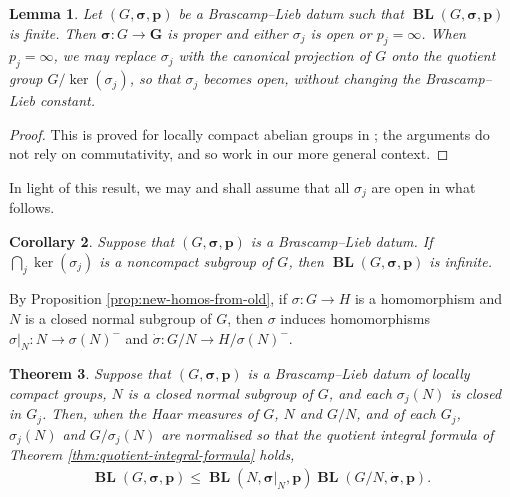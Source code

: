 \documentclass[12pt,twoside,a4paper]{amsart}
\newtheorem{thm}{Theorem}[section]
\newtheorem{lem}[thm]{Lemma}%
\newtheorem{cor}[thm]{Corollary}%
\theoremstyle{definition}
\theoremstyle{remark}
\numberwithin{equation}{section}
\newcommand{\afterbar}{^-}
\newcommand{\BL}{\operatorname{\mathbf{BL}}}
\newcommand{\bss}{\boldsymbol{\sigma}}
\newcommand{\bsds}{\boldsymbol{\dot\sigma}}
\newcommand{\bsp}{\boldsymbol{p}}
\newcommand{\bsG}{\boldsymbol{G}}
\begin{document}
\begin{lem}\label{lem:bss-must-be-proper}
Let $(G, \bss,\bsp)$ be a Brascamp--Lieb datum such that  $\BL(G, \bss,\bsp)$ is finite.
Then $\bss\colon  G \to \bsG $ is proper and either  $\sigma_j$ is open or $p_j = \infty$.
When $p_j = \infty$, we may replace $\sigma_j$ with the canonical projection of $G$ onto the quotient group $G / \ker(\sigma_j)$, so that $\sigma_j$ becomes open, without changing the Brascamp--Lieb constant.
\end{lem}

\begin{proof}
This is proved for locally compact abelian groups in \cite{BC25}; the arguments do not rely on commutativity, and so work in our more general context.
\end{proof}

In light of this result, we may and shall assume that all $\sigma_j$ are open in what follows.


\begin{cor}\label{cor:kernel-compact}
Suppose that $(G, \bss,\bsp)$ is a Brascamp--Lieb datum.
If $\bigcap_j \ker(\sigma_j)$ is a noncompact subgroup of $G$, then $\BL(G, \bss,\bsp)$ is infinite. 
\end{cor}


By Proposition \ref{prop:new-homos-from-old}, if  $\sigma\colon  G \to H$ is a  homomorphism and $N$ is a closed normal subgroup of $G$, then $\sigma$ induces homomorphisms $\sigma|_N \colon  N \to \sigma(N) \afterbar$ and $\dot\sigma\colon  G/N \to H/ \sigma(N)\afterbar$. 

\begin{thm}\label{thm:breaking}
Suppose that  $(G, \bss,\bsp)$ is a Brascamp--Lieb datum of locally compact groups,  $N$ is a closed normal subgroup of $G$, and each $\sigma_j(N)$ is closed in $G_j$.
Then, when the Haar measures of $G$, $N$ and $G/N$, and of each $G_j$, $\sigma_j(N)$ and $G/\sigma_j(N)$ are normalised so that the quotient integral formula of Theorem \ref{thm:quotient-integral-formula} holds,
\begin{align}\label{break}
\BL(G, \bss, \bsp)\leq \BL(N, \bss|_{N}, \bsp) \BL(G/N, \bsds, \bsp).       
\end{align}
\end{thm}
\end{document}
